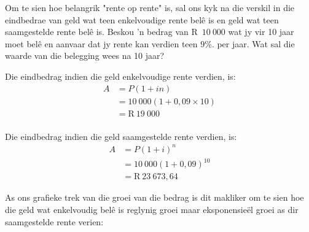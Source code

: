 Om te sien hoe belangrik "rente op rente" is, sal ons kyk na die verskil in die eindbedrae van geld wat teen
enkelvoudige rente belê is en geld wat teen saamgestelde rente belê is. Beskou ’n bedrag van R~$10~000$  wat jy
vir 10 jaar moet belê en aanvaar dat jy rente kan verdien teen $9\%$. per jaar. Wat sal die waarde van die belegging
wees na 10 jaar?\par

Die eindbedrag indien die geld enkelvoudige rente verdien, is:
\begin{align*}
    A &= P(1 + in)\\
      &= 10~000(1 + 0,09 \times 10)\\
      &= \mbox{R}~19~000\\
\end{align*}

Die eindbedrag indien die geld saamgestelde rente verdien, is:
\begin{align*}
    A &= P(1 + i)^n\\
      &= 10~000(1 + 0,09)^10\\
      &= \mbox{R}~23~673,64
\end{align*}

As ons grafieke trek van die groei van die bedrag is dit makliker om te sien hoe die geld wat enkelvoudig bel\^e is reglynig groei maar eksponensie\"el groei as dir saamgestelde rente verien:

\begin{figure}[H]
    \begin{center}
	\label{FG:fig:SI10}
    \end{center}
\end{figure}


